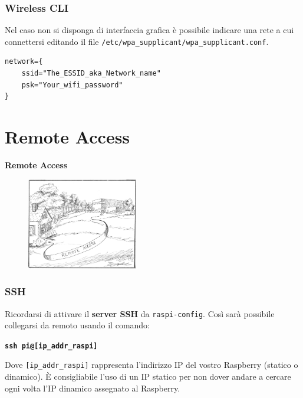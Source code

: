 \documentclass[xcolor=svgnames,11pt]{beamer}
\begin{document}
\begin{frame}[fragile]\frametitle{Wireless CLI}
Nel caso non si disponga di interfaccia grafica \`e possibile indicare una rete a cui connettersi editando il file \texttt{/etc/wpa\_supplicant/wpa\_supplicant.conf}.

\medskip
\begin{verbatim}
network={
    ssid="The_ESSID_aka_Network_name"
    psk="Your_wifi_password"
}
\end{verbatim}
\end{frame}

\section{Remote Access}
\begin{frame}{}
\begin{center}
\begin{Huge}
{\color{green_raspi} \textbf{Remote Access}}
\end{Huge}
\begin{figure}
\includegraphics[height=4cm]{meme5.png}
\end{figure}
\end{center}
\end{frame}

\begin{frame}\frametitle{SSH}
Ricordarsi di attivare il \textbf{server SSH} da \texttt{raspi-config}. Cos\`i sar\`a possibile collegarsi da remoto usando il comando:
\medskip
\begin{block}{}
\begin{center}
\textbf{\texttt{ssh pi@[ip\_addr\_raspi]}}
\end{center}
\end{block}
Dove \texttt{[ip\_addr\_raspi]} rappresenta l'indirizzo IP del vostro Raspberry (statico o dinamico). \`E consigliabile l'uso di un IP statico per non dover andare a cercare ogni volta l'IP dinamico assegnato al Raspberry.
\end{frame}
\end{document}
